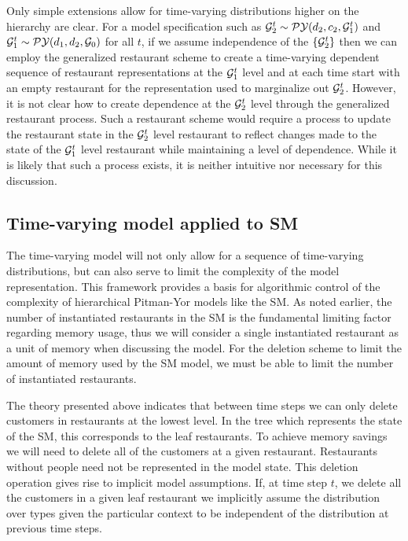 Only simple extensions allow for time-varying distributions higher on the hierarchy are clear.  For a model specification such as $\G_2^t \sim \PY(d_2, c_2, \G_1^t)$ and $\G_1^t  \sim \PY(d_1,d_2,\G_0)$ for all $t$, if we assume independence of the $\{ \G_2^t \}$ then we can employ the generalized restaurant scheme to create a time-varying dependent sequence of restaurant representations at the  $\G_1^t$ level and at each time start with an empty restaurant for the representation used to marginalize out $\G_2^t$.  However, it is not clear how to create dependence at the $\G_2^t$ level through the generalized restaurant process.  Such a restaurant scheme would require a process to update the restaurant state in the $\G_2^t$ level restaurant to reflect changes made to the state of the $\G_1^t$ level restaurant while maintaining a level of dependence.  While it is likely that such a process exists, it is neither intuitive nor necessary for this discussion.

\subsection{Time-varying model applied to SM}

The time-varying model will not only allow for a sequence of time-varying distributions, but can also serve to limit the complexity of the model representation. This framework provides a basis for algorithmic control of the complexity of hierarchical Pitman-Yor models like the SM.  As noted earlier, the number of instantiated restaurants in the SM is the fundamental limiting factor regarding memory usage, thus we will consider a single instantiated restaurant as a unit of memory when discussing the model. For the deletion scheme to limit the amount of memory used by the SM model, we must be able to limit the number of instantiated restaurants.

The theory presented above indicates that between time steps we can only delete customers in restaurants at the lowest level.  In the tree which represents the state of the SM, this corresponds to the leaf restaurants.  To achieve memory savings we will need to delete all of the customers at a given restaurant.  Restaurants without people need not be represented in the model state.  This deletion operation gives rise to implicit model assumptions. If, at time step $t$, we delete all the customers in a given leaf restaurant we implicitly assume the distribution over types given the particular context to be independent of the distribution at previous time steps.

